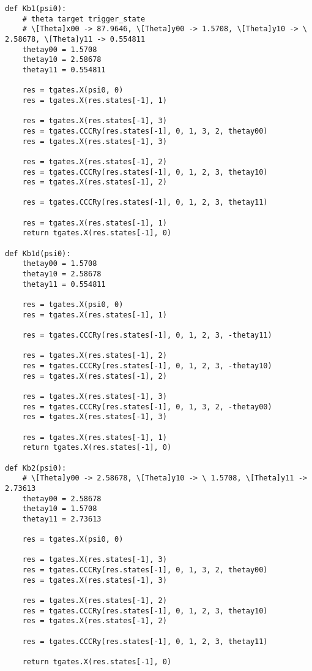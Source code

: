 \begin{verbatim}
def Kb1(psi0):
    # theta target trigger_state
    # \[Theta]x00 -> 87.9646, \[Theta]y00 -> 1.5708, \[Theta]y10 -> \ 2.58678, \[Theta]y11 -> 0.554811
    thetay00 = 1.5708
    thetay10 = 2.58678
    thetay11 = 0.554811

    res = tgates.X(psi0, 0)
    res = tgates.X(res.states[-1], 1)

    res = tgates.X(res.states[-1], 3)
    res = tgates.CCCRy(res.states[-1], 0, 1, 3, 2, thetay00)
    res = tgates.X(res.states[-1], 3)

    res = tgates.X(res.states[-1], 2)
    res = tgates.CCCRy(res.states[-1], 0, 1, 2, 3, thetay10)
    res = tgates.X(res.states[-1], 2)

    res = tgates.CCCRy(res.states[-1], 0, 1, 2, 3, thetay11)

    res = tgates.X(res.states[-1], 1)
    return tgates.X(res.states[-1], 0)

def Kb1d(psi0):
    thetay00 = 1.5708
    thetay10 = 2.58678
    thetay11 = 0.554811

    res = tgates.X(psi0, 0)
    res = tgates.X(res.states[-1], 1)

    res = tgates.CCCRy(res.states[-1], 0, 1, 2, 3, -thetay11)

    res = tgates.X(res.states[-1], 2)
    res = tgates.CCCRy(res.states[-1], 0, 1, 2, 3, -thetay10)
    res = tgates.X(res.states[-1], 2)

    res = tgates.X(res.states[-1], 3)
    res = tgates.CCCRy(res.states[-1], 0, 1, 3, 2, -thetay00)
    res = tgates.X(res.states[-1], 3)

    res = tgates.X(res.states[-1], 1)
    return tgates.X(res.states[-1], 0)

def Kb2(psi0):
    # \[Theta]y00 -> 2.58678, \[Theta]y10 -> \ 1.5708, \[Theta]y11 -> 2.73613
    thetay00 = 2.58678
    thetay10 = 1.5708
    thetay11 = 2.73613

    res = tgates.X(psi0, 0)

    res = tgates.X(res.states[-1], 3)
    res = tgates.CCCRy(res.states[-1], 0, 1, 3, 2, thetay00)
    res = tgates.X(res.states[-1], 3)

    res = tgates.X(res.states[-1], 2)
    res = tgates.CCCRy(res.states[-1], 0, 1, 2, 3, thetay10)
    res = tgates.X(res.states[-1], 2)

    res = tgates.CCCRy(res.states[-1], 0, 1, 2, 3, thetay11)

    return tgates.X(res.states[-1], 0)


\end{verbatim}
